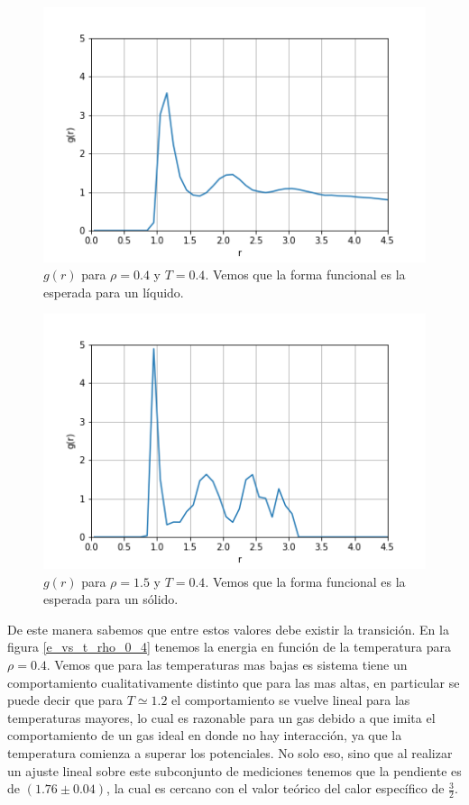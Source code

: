 \documentclass[%
 reprint,
 amsmath,amssymb,
 aps,
]{revtex4-1}
\begin{document}
\begin{figure}
  \begin{center}
  \includegraphics[scale=0.62]{images/liquido.png}
  \caption{$g(r)$ para $\rho = 0.4$ y $T = 0.4$. Vemos que la forma funcional
  es la esperada para un l\'iquido.}
  \label{liquido}
\end{center}
\end{figure}

\begin{figure}
  \begin{center}
  \includegraphics[scale=0.62]{images/solido.png}
  \caption{$g(r)$ para $\rho = 1.5$ y $T = 0.4$. Vemos que la forma funcional
  es la esperada para un s\'olido.}
  \label{solido}
\end{center}
\end{figure}

De este manera sabemos que entre estos valores debe existir la transici\'on. En
la figura \ref{e_vs_t_rho_0_4} tenemos la energia en funci\'on de la
temperatura para $\rho = 0.4$. Vemos que para las temperaturas mas bajas es
sistema tiene un comportamiento cualitativamente distinto que para las mas
altas, en particular se puede decir que para $T \simeq 1.2$ el comportamiento
se vuelve lineal para las temperaturas mayores, lo cual es razonable para un
gas debido a que imita el comportamiento de un gas ideal en donde no hay
interacci\'on, ya que la temperatura comienza a superar los potenciales. No solo
eso, sino que al realizar un ajuste lineal sobre este subconjunto de mediciones
tenemos que la pendiente es de $(1.76 \pm 0.04)$, la cual es cercano con el
valor te\'orico del calor espec\'ifico de $\frac{3}{2}$.
\end{document}
